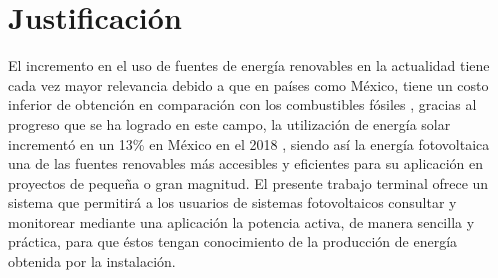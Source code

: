 \section{Justificación}
El incremento en el uso de fuentes de energía renovables en la actualidad tiene cada vez mayor relevancia debido a que en países como México, tiene un costo inferior de obtención en comparación con los combustibles fósiles \citep{Not1}, gracias al progreso que se ha logrado en este campo, la utilización de energía solar incrementó en un 13\% en México en el 2018 \citep{Not2}, siendo así la energía fotovoltaica una de las fuentes renovables más accesibles y eficientes para su aplicación en proyectos de pequeña o gran magnitud.
El presente trabajo terminal ofrece un sistema que permitirá a los usuarios de sistemas fotovoltaicos consultar y monitorear mediante una aplicación la potencia activa, de manera sencilla y práctica, para que éstos tengan conocimiento de la producción de energía obtenida por la instalación.
